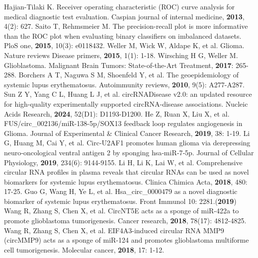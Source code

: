 \documentclass[journal=jcisd8,manuscript=article]{achemso}
\begin{document}
\begin{thebibliography}{}
Hajian-Tilaki K. Receiver operating characteristic (ROC) curve analysis for medical diagnostic test evaluation. Caspian journal of internal medicine, \textbf{2013}, 4(2): 627.
Saito T, Rehmsmeier M. The precision-recall plot is more informative than the ROC plot when evaluating binary classifiers on imbalanced datasets. PloS one, \textbf{2015}, 10(3): e0118432.
%
Weller M, Wick W, Aldape K, et al. Glioma. Nature reviews Disease primers, \textbf{2015}, 1(1): 1-18.
%
Wirsching H G, Weller M. Glioblastoma. Malignant Brain Tumors: State-of-the-Art Treatment, \textbf{2017}: 265-288.
%
Borchers A T, Naguwa S M, Shoenfeld Y, et al. The geoepidemiology of systemic lupus erythematosus. Autoimmunity reviews, \textbf{2010}, 9(5): A277-A287.
Sun Z Y, Yang C L, Huang L J, et al. circRNADisease v2.0: an updated resource for high-quality experimentally supported circRNA-disease associations. Nucleic Acids Research, \textbf{2024}, 52(D1): D1193-D1200.
%
He Z, Ruan X, Liu X, et al. FUS/circ\_002136/miR-138-5p/SOX13 feedback loop regulates angiogenesis in Glioma. Journal of Experimental \& Clinical Cancer Research, \textbf{2019}, 38: 1-19.
Li G, Huang M, Cai Y, et al. Circ‐U2AF1 promotes human glioma via derepressing neuro‐oncological ventral antigen 2 by sponging hsa‐miR‐7‐5p. Journal of Cellular Physiology, \textbf{2019}, 234(6): 9144-9155.
Li H, Li K, Lai W, et al. Comprehensive circular RNA profiles in plasma reveals that circular RNAs can be used as novel biomarkers for systemic lupus erythematosus. Clinica Chimica Acta, \textbf{2018}, 480: 17-25.
Guo G, Wang H, Ye L, et al. Hsa\_circ\_0000479 as a novel diagnostic biomarker of systemic lupus erythematosus. Front Immunol 10: 2281.(\textbf{2019})
Wang R, Zhang S, Chen X, et al. CircNT5E acts as a sponge of miR-422a to promote glioblastoma tumorigenesis. Cancer research, \textbf{2018}, 78(17): 4812-4825.
Wang R, Zhang S, Chen X, et al. EIF4A3-induced circular RNA MMP9 (circMMP9) acts as a sponge of miR-124 and promotes glioblastoma multiforme cell tumorigenesis. Molecular cancer, \textbf{2018}, 17: 1-12.
\end{thebibliography}
\end{document}
